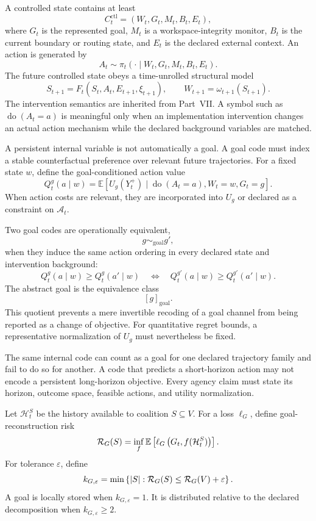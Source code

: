 A controlled state contains at least
\[
C_t^{\mathrm{ctl}}
=
\left(
W_t,G_t,M_t,B_t,E_t
\right),
\]
where \(G_t\) is the represented goal, \(M_t\) is a workspace-integrity
monitor, \(B_t\) is the current boundary or routing state, and \(E_t\) is the
declared external context. An action is generated by
\[
A_t
\sim
\pi_t
\left(
\cdot\mid W_t,G_t,M_t,B_t,E_t
\right).
\]
The future controlled state obeys a time-unrolled structural model
\[
S_{t+1}
=
F_t(S_t,A_t,E_{t+1},\xi_{t+1}),
\qquad
W_{t+1}=\omega_{t+1}(S_{t+1}).
\]
The intervention semantics are inherited from Part~VII. A symbol such as
\(\operatorname{do}(A_t=a)\) is meaningful only when an implementation
intervention changes an actual action mechanism while the declared background
variables are matched.


A persistent internal variable is not automatically a goal. A goal code must
index a stable counterfactual preference over relevant future trajectories.
For a fixed state \(w\), define the goal-conditioned action value
\[
Q_t^g(a\mid w)
=
\mathbb E
\left[
U_g(Y_t^+)
\mid
\operatorname{do}(A_t=a),
W_t=w,
G_t=g
\right].
\]
When action costs are relevant, they are incorporated into \(U_g\) or declared
as a constraint on \(\mathcal A_t\).

Two goal codes are operationally equivalent,
\[
g\sim_{\mathrm{goal}}g',
\]
when they induce the same action ordering in every declared state and
intervention background:
\[
Q_t^g(a\mid w)
\geq
Q_t^g(a'\mid w)
\quad\Longleftrightarrow\quad
Q_t^{g'}(a\mid w)
\geq
Q_t^{g'}(a'\mid w).
\]
The abstract goal is the equivalence class
\[
[g]_{\mathrm{goal}}.
\]
This quotient prevents a mere invertible recoding of a goal channel from being
reported as a change of objective. For quantitative regret bounds, a
representative normalization of \(U_g\) must nevertheless be fixed.

\begin{remark}
The same internal code can count as a goal for one declared trajectory family
and fail to do so for another. A code that predicts a short-horizon action may
not encode a persistent long-horizon objective. Every agency claim must state
its horizon, outcome space, feasible actions, and utility normalization.
\end{remark}


Let \(\mathcal H_t^S\) be the history available to coalition \(S\subseteq V\).
For a loss \(\ell_G\), define goal-reconstruction risk
\[
\mathcal R_G(S)
=
\inf_f
\mathbb E
\left[
\ell_G
\left(
G_t,
f(\mathcal H_t^S)
\right)
\right].
\]
For tolerance \(\varepsilon\), define
\[
k_{G,\varepsilon}
=
\min
\left\{
|S|:
\mathcal R_G(S)
\leq
\mathcal R_G(V)+\varepsilon
\right\}.
\]
A goal is locally stored when \(k_{G,\varepsilon}=1\). It is distributed
relative to the declared decomposition when \(k_{G,\varepsilon}\geq2\).

